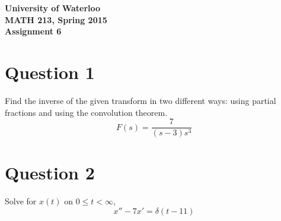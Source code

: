 \documentclass[12pt]{article}
\begin{document}
\begin{center}
{\Large\bf University of Waterloo}\\
\vspace{3mm}
{\Large\bf MATH 213, Spring 2015}\\
\vspace{2mm}
{\Large\bf Assignment 6}\\
\end{center}

\section*{Question 1}
Find the inverse of the given transform in two different ways: using partial fractions and using the convolution theorem. $$F(s) = \frac{7}{(s-3)s^3}$$

\section*{Question 2}
Solve for $x(t)$ on $0 \leq t < \infty$, $$x''-7x'=\delta(t-11)$$
\end{document}
